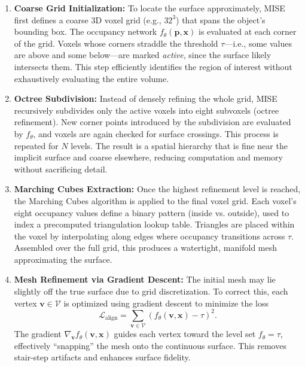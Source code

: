 \begin{enumerate}[label=\textbf{Step \arabic*}]
    
    \item \textbf{Coarse Grid Initialization:}
    To locate the surface approximately, MISE first defines a coarse 3D voxel grid (e.g., \(32^3\)) that spans the object’s bounding box. The occupancy network \( f_\theta(\mathbf{p}, \mathbf{x}) \) is evaluated at each corner of the grid. Voxels whose corners straddle the threshold \( \tau \)—i.e., some values are above and some below—are marked \emph{active}, since the surface likely intersects them. This step efficiently identifies the region of interest without exhaustively evaluating the entire volume.
    
    \item \textbf{Octree Subdivision:}
    Instead of densely refining the whole grid, MISE recursively subdivides only the active voxels into eight subvoxels (octree refinement). New corner points introduced by the subdivision are evaluated by \( f_\theta \), and voxels are again checked for surface crossings. This process is repeated for \( N \) levels. The result is a spatial hierarchy that is fine near the implicit surface and coarse elsewhere, reducing computation and memory without sacrificing detail.
    
    \item \textbf{Marching Cubes Extraction:}
    Once the highest refinement level is reached, the Marching Cubes algorithm \cite{lorensen1987_marchingcubes} is applied to the final voxel grid. Each voxel's eight occupancy values define a binary pattern (inside vs. outside), used to index a precomputed triangulation lookup table. Triangles are placed within the voxel by interpolating along edges where occupancy transitions across \( \tau \). Assembled over the full grid, this produces a watertight, manifold mesh approximating the surface.
    
    \item \textbf{Mesh Refinement via Gradient Descent:}
    The initial mesh may lie slightly off the true surface due to grid discretization. To correct this, each vertex \( \mathbf{v} \in \mathcal{V} \) is optimized using gradient descent to minimize the loss
    \[
    \mathcal{L}_{\text{align}} = \sum_{\mathbf{v} \in \mathcal{V}} \left( f_\theta(\mathbf{v}, \mathbf{x}) - \tau \right)^2.
    \]
    The gradient \( \nabla_{\mathbf{v}} f_\theta(\mathbf{v}, \mathbf{x}) \) guides each vertex toward the level set \( f_\theta = \tau \), effectively “snapping” the mesh onto the continuous surface. This removes stair-step artifacts and enhances surface fidelity.
    
\end{enumerate}

